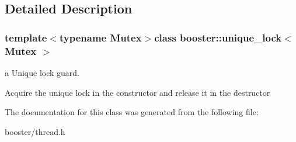 \subsection{Detailed Description}
\subsubsection*{template$<$typename Mutex$>$class booster\-::unique\-\_\-lock$<$ Mutex $>$}

a Unique lock guard. 

Acquire the unique lock in the constructor and release it in the destructor 

The documentation for this class was generated from the following file\-:\begin{DoxyCompactItemize}
\item 
booster/thread.\-h\end{DoxyCompactItemize}
